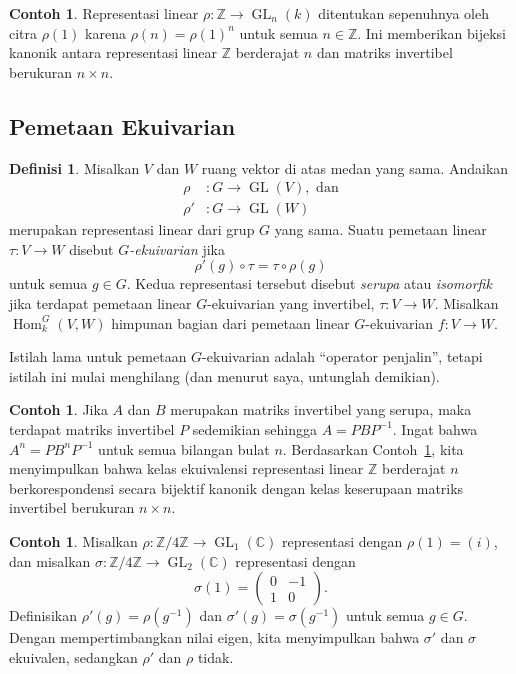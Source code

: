 \documentclass[12pt]{article}
\theoremstyle{plain}
\theoremstyle{definition}
\newtheorem{definition}[theorem]{Definisi}
\newtheorem{example}[theorem]{Contoh}
\theoremstyle{remark}
\numberwithin{equation}{section}
\begin{document}
\begin{example} \label{ex:lin_alg_is_Z_rep_theory}
Representasi linear $\rho : \mathbb{Z} \to \operatorname{GL}_n(k)$
ditentukan sepenuhnya oleh citra $\rho(1)$
karena $\rho(n)=\rho(1)^n$ untuk semua $n \in \mathbb{Z}$.
Ini memberikan bijeksi kanonik antara representasi linear
$\mathbb{Z}$ berderajat $n$ dan
matriks invertibel berukuran $n \times n$.
\end{example}

\subsection{Pemetaan Ekuivarian}

\begin{definition}
Misalkan $V$ dan $W$ ruang vektor di atas medan yang sama.
Andaikan
\begin{align*}
\rho &: G \to \operatorname{GL}(V), \textrm{ dan}\\
\rho' &: G \to \operatorname{GL}(W)
\end{align*}
merupakan representasi linear dari grup $G$ yang sama.
Suatu pemetaan linear $\tau : V \to W$ disebut \emph{$G$-ekuivarian} jika
\[
\rho'(g) \circ \tau = \tau \circ \rho(g)
\]
untuk semua $g \in G$.
Kedua representasi tersebut disebut \emph{serupa} atau \emph{isomorfik} jika
terdapat pemetaan linear $G$-ekuivarian yang invertibel, $\tau : V \to W$.
Misalkan $\operatorname{Hom}_k^G(V,W)$ himpunan bagian dari
pemetaan linear $G$-ekuivarian $f : V \to W$.
\end{definition}

Istilah lama untuk pemetaan $G$-ekuivarian adalah “operator penjalin”,
tetapi istilah ini mulai menghilang (dan menurut saya, untunglah demikian).

\begin{example}
Jika $A$ dan $B$ merupakan matriks invertibel yang serupa, maka terdapat
matriks invertibel $P$ sedemikian sehingga $A=PBP^{-1}$.
Ingat bahwa $A^n=PB^nP^{-1}$ untuk semua bilangan bulat $n$.
Berdasarkan Contoh~\ref{ex:lin_alg_is_Z_rep_theory}, kita menyimpulkan bahwa
kelas ekuivalensi representasi linear
$\mathbb{Z}$ berderajat $n$ berkorespondensi secara bijektif kanonik dengan
kelas keserupaan matriks invertibel berukuran $n \times n$.
\end{example}

\begin{example}
Misalkan $\rho : \mathbb{Z}/4\mathbb{Z} \to
\operatorname{GL}_1(\mathbb{C})$
representasi dengan $\rho(1)=(i)$,
dan misalkan $\sigma : \mathbb{Z}/4\mathbb{Z} \to
\operatorname{GL}_2(\mathbb{C})$
representasi dengan
\[
\sigma(1) = \begin{pmatrix} 0&-1\\1&0 \end{pmatrix} .
\]
Definisikan $\rho'(g)=\rho(g^{-1})$
dan $\sigma'(g)=\sigma(g^{-1})$ untuk semua $g \in G$.
Dengan mempertimbangkan nilai eigen, kita menyimpulkan bahwa
$\sigma'$ dan $\sigma$ ekuivalen, sedangkan $\rho'$ dan $\rho$ tidak.
\end{example}
\end{document}
